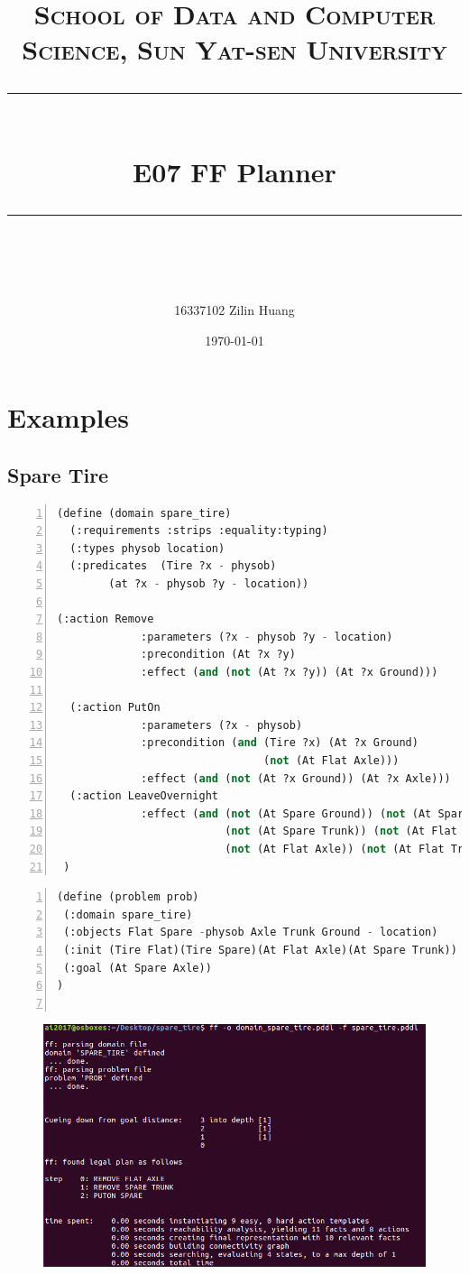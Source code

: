 ﻿\documentclass[a4paper, 11pt]{article}
\title{	
\normalfont \normalsize
\textsc{School of Data and Computer Science, Sun Yat-sen University} \\ [25pt] %
\rule{\textwidth}{0.5pt} \\[0.4cm] %
\huge  E07 FF Planner \\ %
\rule{\textwidth}{2pt} \\[0.5cm] %
\author{16337102 Zilin Huang}
\date{\normalsize\today}
}
\begin{document}
\maketitle
\tableofcontents
\newpage

\section{Examples}

\subsection{Spare Tire}
\label{sec:spare-tire}

\begin{lstlisting}[title=domain\_spare\_tire.pddl,frame=single,language=lisp,numbers=left]
(define (domain spare_tire)
  (:requirements :strips :equality:typing)
  (:types physob location)
  (:predicates  (Tire ?x - physob)
		(at ?x - physob ?y - location))

(:action Remove
             :parameters (?x - physob ?y - location)
             :precondition (At ?x ?y)
             :effect (and (not (At ?x ?y)) (At ?x Ground)))

  (:action PutOn
             :parameters (?x - physob)
             :precondition (and (Tire ?x) (At ?x Ground)
                                (not (At Flat Axle)))
             :effect (and (not (At ?x Ground)) (At ?x Axle)))
  (:action LeaveOvernight
             :effect (and (not (At Spare Ground)) (not (At Spare Axle))
                          (not (At Spare Trunk)) (not (At Flat Ground))
                          (not (At Flat Axle)) (not (At Flat Trunk)) ))
 )

\end{lstlisting}
\begin{lstlisting}[title=spare\_tire.pddl,frame=single,language=lisp,numbers=left]
(define (problem prob)
 (:domain spare_tire)
 (:objects Flat Spare -physob Axle Trunk Ground - location)
 (:init (Tire Flat)(Tire Spare)(At Flat Axle)(At Spare Trunk))
 (:goal (At Spare Axle))
)


\end{lstlisting}
\begin{figure}[h]
  \centering
  \includegraphics[width=16cm]{Pic/spare_tire}
\end{figure}
\end{document}
